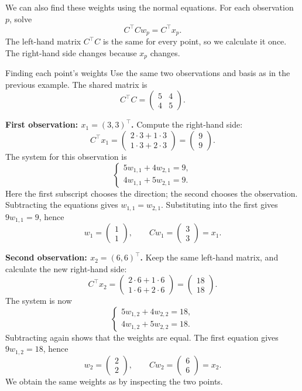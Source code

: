\documentclass[a4paper,12pt,oneside]{report}
\begin{document}
We can also find these weights using the normal equations.
For each observation $p$, solve
\[
  C^\top Cw_p=C^\top x_p.
\]
The left-hand matrix $C^\top C$ is the same for every point, so we
calculate it once. The right-hand side changes because $x_p$ changes.

\begin{framedexample}{Finding each point's weights}
Use the same two observations and basis as in the previous example.
The shared matrix is
\[
  C^\top C=\begin{pmatrix}5&4\\4&5\end{pmatrix}.
\]

\textbf{First observation: $x_1=(3,3)^\top$.}
Compute the right-hand side:
\[
  C^\top x_1
  =\begin{pmatrix}2\cdot3+1\cdot3\\1\cdot3+2\cdot3\end{pmatrix}
  =\begin{pmatrix}9\\9\end{pmatrix}.
\]
The system for this observation is
\[
  \begin{cases}
    5w_{1,1}+4w_{2,1}=9,\\
    4w_{1,1}+5w_{2,1}=9.
  \end{cases}
\]
Here the first subscript chooses the direction; the second chooses
the observation. Subtracting the equations gives
$w_{1,1}=w_{2,1}$. Substituting into the first gives
$9w_{1,1}=9$, hence
\[
  w_1=\begin{pmatrix}1\\1\end{pmatrix},\qquad
  Cw_1=\begin{pmatrix}3\\3\end{pmatrix}=x_1.
\]

\textbf{Second observation: $x_2=(6,6)^\top$.}
Keep the same left-hand matrix, and calculate the new right-hand side:
\[
  C^\top x_2
  =\begin{pmatrix}2\cdot6+1\cdot6\\1\cdot6+2\cdot6\end{pmatrix}
  =\begin{pmatrix}18\\18\end{pmatrix}.
\]
The system is now
\[
  \begin{cases}
    5w_{1,2}+4w_{2,2}=18,\\
    4w_{1,2}+5w_{2,2}=18.
  \end{cases}
\]
Subtracting again shows that the weights are equal.
The first equation gives $9w_{1,2}=18$, hence
\[
  w_2=\begin{pmatrix}2\\2\end{pmatrix},\qquad
  Cw_2=\begin{pmatrix}6\\6\end{pmatrix}=x_2.
\]
We obtain the same weights as by inspecting the two points.
\end{framedexample}
\end{document}
